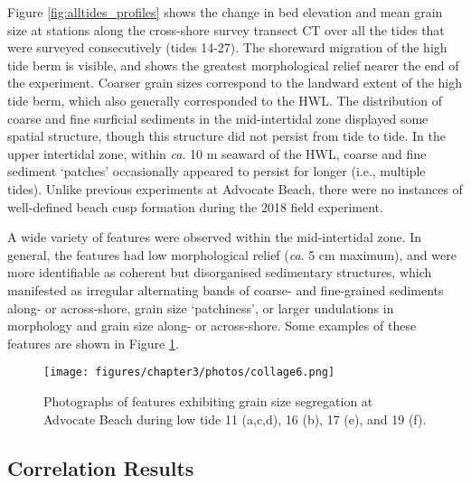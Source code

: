 \documentclass[jmse,article,submit,pdftex,moreauthors]{Definitions/mdpi}
\begin{document}
Figure \ref{fig:alltides_profiles} shows the change in bed elevation and mean grain size at stations along the cross-shore survey transect CT over all the tides that were surveyed consecutively (tides 14-27). The shoreward migration of the high tide berm is visible, and shows the greatest morphological relief nearer the end of the experiment. Coarser grain sizes correspond to the landward extent of the high tide berm, which also generally corresponded to the HWL. The distribution of coarse and fine surficial sediments in the mid-intertidal zone displayed some spatial structure, though this structure did not persist from tide to tide. In the upper intertidal zone, within \textit{ca}. 10 m seaward of the HWL, coarse and fine sediment `patches' occasionally appeared to persist for longer (i.e., multiple tides). Unlike previous experiments at Advocate Beach, there were no instances of well-defined beach cusp formation during the 2018 field experiment. 

A wide variety of features were observed within the mid-intertidal zone. In general, the features had low morphological relief (\textit{ca}. 5 cm maximum), and were more identifiable as coherent but disorganised sedimentary structures, which manifested as irregular alternating bands of coarse- and fine-grained sediments along- or across-shore, grain size `patchiness', or larger undulations in morphology and grain size along- or across-shore. Some examples of these features are shown in Figure \ref{fig:patchiness_photo3}.

\begin{figure}[tbp] %
	\texttt{[image: figures/chapter3/photos/collage6.png]}
	\caption[Photographs of grain size segregation at Advocate Beach]{Photographs of features exhibiting grain size segregation at Advocate Beach during low tide 11 (a,c,d), 16 (b), 17 (e), and 19 (f).}
	\label{fig:patchiness_photo3}
\end{figure}



\subsection{Correlation Results}\label{Results:Correlation}
\end{document}

